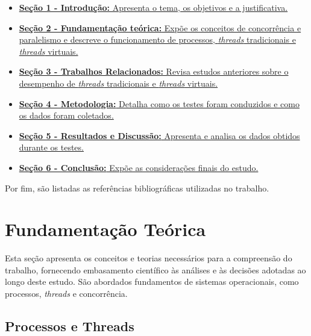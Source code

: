 \documentclass[12pt, openright, oneside, a4paper, english,	french,	spanish, brazil	]{abntex2}
\begin{document}
        \begin{itemize}
            \item \hyperref[chapter:introducao]{\textbf{Seção 1 - Introdução:} Apresenta o tema, os objetivos e a justificativa.}
            
            \item \hyperref[chapter:fundamentacaoTeorica]{\textbf{Seção 2 - Fundamentação teórica:} Expõe os conceitos de concorrência e paralelismo e descreve o funcionamento de processos, \textit{threads} tradicionais e \textit{threads} virtuais.}
            
            \item \hyperref[chapter:trabalhos]{\textbf{Seção 3 - Trabalhos Relacionados:} Revisa estudos anteriores sobre o desempenho de \textit{threads} tradicionais e \textit{threads} virtuais.}
            
            \item \hyperref[chapter:metodologia]{\textbf{Seção 4 - Metodologia:} Detalha como os testes foram conduzidos e como os dados foram coletados.}
            
            \item \hyperref[chapter:resultados]{\textbf{Seção 5 - Resultados e Discussão:} Apresenta e analisa os dados obtidos durante os testes.}
           
            \item \hyperref[chapter:conclusao]{\textbf{Seção 6 - Conclusão:} Expõe as considerações finais do estudo.}
        \end{itemize}


        Por fim, são listadas as referências bibliográficas utilizadas no trabalho.

    \setcounter{chapter}{1}
    \chapter{Fundamentação Teórica}
    \label{chapter:fundamentacaoTeorica}

    Esta seção apresenta os conceitos e teorias necessários para a compreensão do trabalho, fornecendo embasamento científico às análises e às decisões adotadas ao longo deste estudo. São abordados fundamentos de sistemas operacionais, como processos, \textit{threads} e concorrência.

    \section{Processos e Threads}
\end{document}
